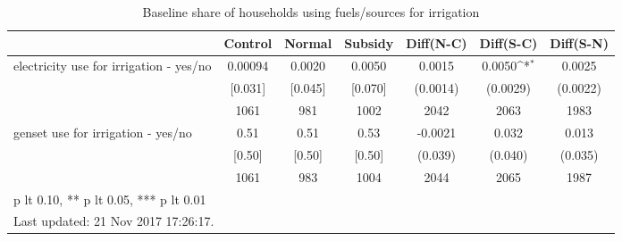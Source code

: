 \begin{table}[htbp]\centering
\def\sym#1{\ifmmode^{#1}\else\(^{#1}\)\fi}
\caption{Baseline share of households using fuels/sources for irrigation \label{tab:"balance"}}
\begin{tabular*}{1\hsize}{@{\hskip\tabcolsep\extracolsep\fill}l*{1}{cccccc}}
\toprule
                                &  Control&   Normal&  Subsidy&Diff(N-C)         &Diff(S-C)         &Diff(S-N)         \\
\midrule
electricity use for irrigation  - yes/no&  0.00094&   0.0020&   0.0050&   0.0015         &   0.0050\sym{*}  &   0.0025         \\
                                &  [0.031]&  [0.045]&  [0.070]& (0.0014)         & (0.0029)         & (0.0022)         \\
                                &     1061&      981&     1002&     2042         &     2063         &     1983         \\
genset use for irrigation  - yes/no&     0.51&     0.51&     0.53&  -0.0021         &    0.032         &    0.013         \\
                                &   [0.50]&   [0.50]&   [0.50]&  (0.039)         &  (0.040)         &  (0.035)         \\
                                &     1061&      983&     1004&     2044         &     2065         &     1987         \\
\bottomrule
\multicolumn{7}{l}{\footnotesize * p lt 0.10, ** p lt 0.05, *** p lt 0.01}\\
\multicolumn{7}{l}{\footnotesize Last updated: 21 Nov 2017 17:26:17.}\\
\end{tabular*}
\end{table}
